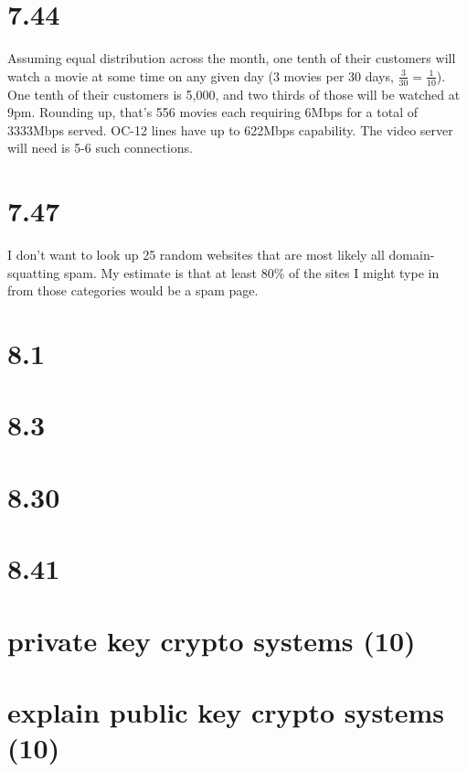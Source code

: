 \documentclass[a4paper,12pt]{article}
\begin{document}
\section*{7.44}
Assuming equal distribution across the month, one tenth of their
customers will watch a movie at some time on any given day (3 movies
per 30 days, $\frac{3}{30} = \frac{1}{10}$). One tenth of their
customers is 5,000, and two thirds of those will be watched at
9pm. Rounding up, that's 556 movies each requiring 6Mbps for a total
of 3333Mbps served. OC-12 lines have up to 622Mbps capability. The
video server will need is 5-6 such connections.

\section*{7.47}
I don't want to look up 25 random websites that are most likely all
domain-squatting spam. My estimate is that at least 80\% of the sites
I might type in from those categories would be a spam page.

\section*{8.1}


\section*{8.3}

\section*{8.30}

\section*{8.41}

\section*{private key crypto systems (10)}

\section*{explain public key crypto systems (10)}
\end{document}
